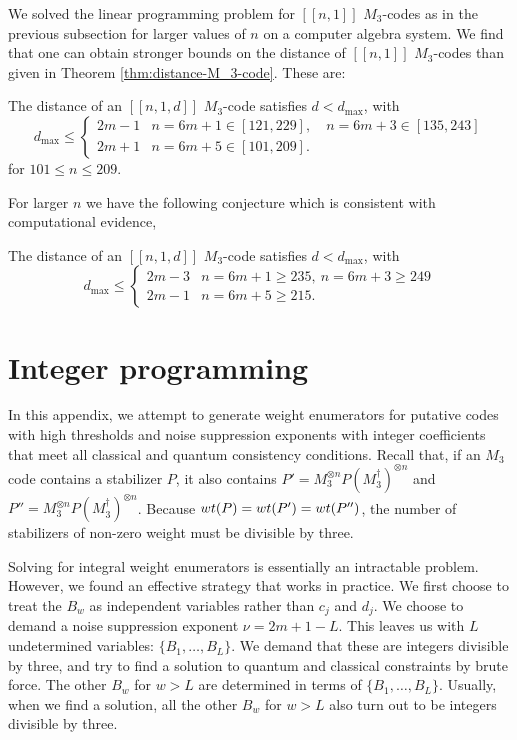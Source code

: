\documentclass[11pt]{article}
\newcommand{\wt}{{\rm{wt}} }
\begin{document}
We solved the linear programming problem for $[[n,1]]$ $M_3$-codes as in the previous subsection for larger values of $n$ on a computer algebra system. We find that one can obtain stronger bounds on the distance of $[[n,1]]$ $M_3$-codes than given in Theorem \ref{thm:distance-M_3-code}. These are:
\begin{theorem}
The distance of an $[[n,1,d]]$ $M_{3}$-code satisfies $d<d_{\max}$, with  
\begin{equation}
    d_{\text{max}} \leq \begin{cases}
        2m-1  & n = 6m+1 \in [121, 229 ], \quad
        n=6m+3 \in [135, 243 ]\\
        2m+1  & n = 6m+5 \in [101,209].
    \end{cases}
\end{equation}
for $101\leq n \leq 209$.
\end{theorem}
For larger $n$ we have the following conjecture which is consistent with computational evidence,
\begin{conjecture}
The distance of an $[[n,1,d]]$ $M_{3}$-code satisfies $d<d_{\max}$, with  
\begin{equation}
    d_{\text{max}} \leq \begin{cases}
        2m-3  & n = 6m+1\geq 235, ~
        n=6m+3 \geq  249 \\
        2m-1  & n = 6m+5\geq 215.
    \end{cases}
\end{equation}
\end{conjecture}





\section{Integer programming}
\label{app:integer-programming}


In this appendix, we attempt to generate weight enumerators for putative codes with high thresholds and noise suppression exponents with integer coefficients that meet all classical and quantum consistency conditions. Recall that, if an $M_3$ code contains a stabilizer $P$, it also contains $P'=M_3^{\otimes n} P (M_3^\dagger)^{\otimes n}$ and $P''=M_3^{\otimes n} P (M_3^\dagger)^{\otimes n}$. Because $\wt(P)=\wt(P')=\wt(P'')$, the number of stabilizers of non-zero weight must be divisible by three.  

Solving for integral weight enumerators is essentially an intractable problem. However, we found an effective strategy that works in practice. We first choose to treat the $B_w$ as independent variables rather than $c_j$ and $d_j$. We choose to demand a noise suppression exponent $\nu=2m+1-L$. This leaves us with $L$ undetermined variables:  $\{B_1, \ldots, B_L\}$. We demand that these are integers divisible by three, and try to find a solution to quantum and classical constraints by brute force. The other $B_w$ for $w>L$ are determined in terms of $\{B_1, \ldots, B_L\}$. Usually, when we find a solution, all the other $B_w$ for $w>L$ also turn out to be integers divisible by three. 
\end{document}
